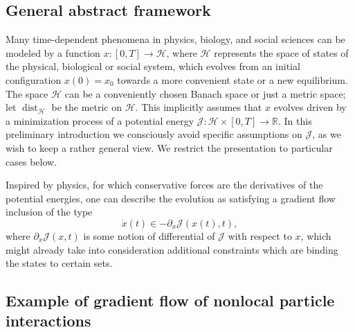 
\subsection{General abstract framework}

Many time-dependent phenomena in physics, biology, and social sciences can be modeled by a function $x:[0,T] \to \mathcal H$, where $\mathcal H$ represents the space of states of the physical, biological or social system, which evolves from an initial configuration $x(0)=x_0$  towards a more convenient state or a new equilibrium. The space $\mathcal H$ can be a conveniently chosen Banach space or just a metric space; let $\operatorname{dist}_{\mathcal H}$ be the metric on $\mathcal H$.
This implicitly assumes that $x$ evolves driven by a minimization process of a potential energy $\mathcal J: \mathcal H \times [0,T] \to \mathbb R$.  In this preliminary introduction we consciously avoid specific assumptions on  $\mathcal J$, as we wish to keep a rather general view. We restrict the presentation to particular cases below.%

Inspired by physics, for which conservative forces are the derivatives of the potential energies, one can describe the evolution as satisfying a gradient flow inclusion of the type
\begin{equation}\label{gradientflow}
\dot x(t) \in - \partial_x \mathcal J(x(t),t),
\end{equation}
where $\partial_x \mathcal J(x,t)$ is some notion of differential of $\mathcal J$ with respect to $x$, which might already take into consideration additional constraints which are binding the states to certain sets.



\subsection{Example of gradient flow of nonlocal particle interactions}\label{sec:gradflow}

